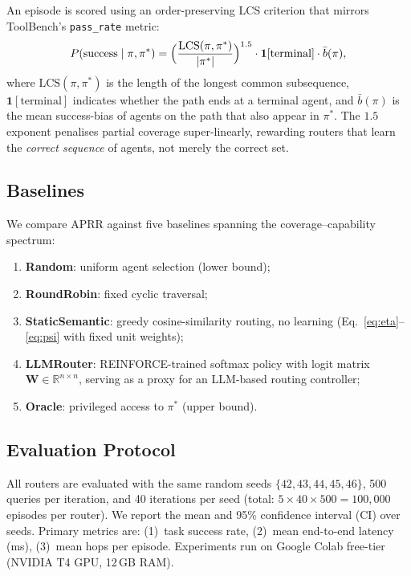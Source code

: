 \documentclass[journal,twocolumn,letterpaper]{IEEEtran}
\newcommand{\APRR}{\textsc{APRR}}
\newcommand{\WW}{\mathbf{W}}
\newcommand{\RR}{\mathbb{R}}
\begin{document}
An episode is scored using an order-preserving LCS criterion that mirrors
ToolBench's \texttt{pass\_rate} metric:
\begin{equation}
  P(\text{success} \mid \pi, \pi^*) =
  \Bigl(\frac{\text{LCS}(\pi,\pi^*)}{|\pi^*|}\Bigr)^{1.5}
  \cdot \mathbf{1}[\text{terminal}]
  \cdot \bar{b}(\pi),
\label{eq:success}
\end{equation}
where $\text{LCS}(\pi,\pi^*)$ is the length of the longest common subsequence,
$\mathbf{1}[\text{terminal}]$ indicates whether the path ends at a terminal
agent, and $\bar{b}(\pi)$ is the mean success-bias of agents on the path that
also appear in $\pi^*$.  The $1.5$ exponent penalises partial coverage
super-linearly, rewarding routers that learn the \emph{correct sequence} of
agents, not merely the correct set.

\subsection{Baselines}

We compare \APRR{} against five baselines spanning the
coverage--capability spectrum:
\begin{enumerate}
  \item \textbf{Random}: uniform agent selection (lower bound);
  \item \textbf{RoundRobin}: fixed cyclic traversal;
  \item \textbf{StaticSemantic}: greedy cosine-similarity routing, no
        learning (Eq.~\eqref{eq:eta}--\eqref{eq:psi} with fixed unit weights);
  \item \textbf{LLMRouter}: REINFORCE-trained softmax policy with
        logit matrix $\WW\in\RR^{n\times n}$, serving as a proxy for
        an LLM-based routing controller;
  \item \textbf{Oracle}: privileged access to $\pi^*$ (upper bound).
\end{enumerate}

\subsection{Evaluation Protocol}

All routers are evaluated with the same random seeds
$\{42,43,44,45,46\}$, 500 queries per iteration, and 40 iterations per
seed (total: $5\times40\times500=100{,}000$ episodes per router).  We report
the mean and 95\% confidence interval (CI) over seeds.  Primary metrics are:
(1)~task success rate, (2)~mean end-to-end latency (ms), (3)~mean hops per
episode.  Experiments run on Google Colab free-tier (NVIDIA T4 GPU, 12\,GB RAM).
\end{document}
